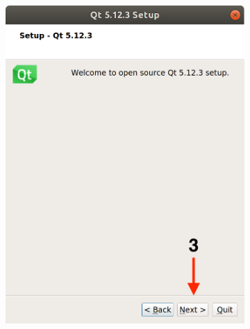 \begin{figure}[H]
\begin{subfigure}{0.32\linewidth}
        \includegraphics[width=1\textwidth]{Images/Qt3.png}
    \end{subfigure}
    \begin{subfigure}{0.32\linewidth}

\end{subfigure}
\end{figure}
